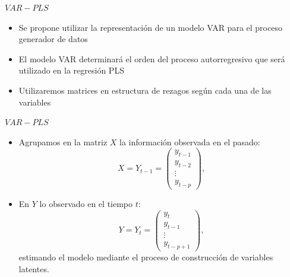 \documentclass{beamer}
\newcommand{\?}{?`}
\begin{document}
\begin{frame}{$VAR-PLS$}
  \begin{itemize}
  \item Se propone utilizar la representaci\'on de un modelo VAR para
    el proceso generador de datos
  \item El modelo VAR determinar\'a el orden del proceso
    autorregresivo que ser\'a utilizado en la regresi\'on PLS
  \item Utilizaremos matrices en estructura de rezagos seg\'un cada
    una de las variables
  \end{itemize}
\end{frame}

\begin{frame}{$VAR-PLS$}
  \begin{itemize}
  \item Agrupamos en la matriz $X$ la informaci\'on observada en el
    pasado:
    \begin{displaymath}
      X=Y_{t-1}=\left(
        \begin{array}{c}
          y_{t-1} \\
          y_{t-2} \\
          \vdots \\
          y_{t-p}
        \end{array}
      \right), 
    \end{displaymath}
  \item En $Y$ lo observado en el tiempo $t$:
    \begin{displaymath}
      Y=Y_{t}=\left(
        \begin{array}{c}
          y_t \\
          y_{t-1} \\
          \vdots \\
          y_{t-p+1}
        \end{array}
      \right), 
    \end{displaymath}
    estimando el modelo mediante el proceso de construcci\'on de
    variables latentes.
  \end{itemize}
\end{frame}
\end{document}
